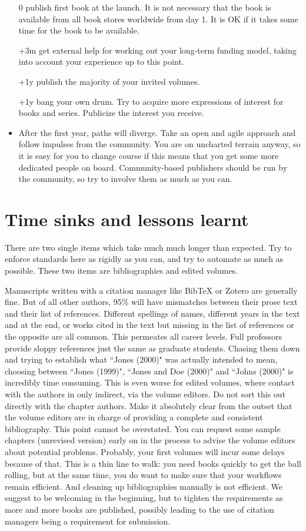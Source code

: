 \documentclass[nonflat,modfonts,output=book] {langsci/langscibook}
\begin{document}
\begin{itemize}
 \item[0] publish first book at the launch. It is not necessary that the book is available from all book stores worldwide from day 1. It is OK if it takes some time for the book to be available. 
 \item[+3m] get external help for working out your long-term funding model, taking into account your experience up to this point. 
 \item[+1y] publish the majority of your invited volumes. 
 \item[+1y] bang your own drum. Try to acquire more expressions of interest for books and series. Publicize the interest you receive. 
 \item After the first year, paths will diverge. Take an open and agile approach and follow impulses from the community. You are on uncharted terrain anyway, so it is easy for you to change course if this means that you get some more dedicated people on board. Community-based publishers should be run by the community, so try to involve them as much as you can.
\end{itemize}


\chapter{Time sinks and lessons learnt}
There are two single items which take much much longer than expected. Try to enforce standards here as rigidly as you can, and try to automate as much as possible. These two items are bibliographies and edited volumes. 

Manuscripts written with a citation manager like BibTeX or Zotero are generally fine. But of all other authors, 95\% will have mismatches between their prose text and their list of references. Different spellings of names, different years in the text and at the end, or works cited in the text but missing in the list of references or the opposite are all common. This permeates all career levels. Full professors provide sloppy references just the same as graduate students. Chasing them down and trying to establish what ``Jones (2000)" was actually intended to mean, choosing between ``Jones (1999)", ``Jones and Doe (2000)" and ``Johns (2000)" is incredibly time consuming. This is even worse for edited volumes, where contact with the authors in only indirect, via the volume editors. Do not sort this out directly with the chapter authors. Make it absolutely clear from the outset that the volume editors are in charge of providing a complete and consistent bibliography. This point cannot be overstated. You can request some sample chapters (unrevised version) early on in the process to advise the volume editors about potential problems. Probably, your first volumes will incur some delays because of that. This is a thin line to walk: you need books quickly to get the ball rolling, but at the same time, you do want to make sure that your workflows remain efficient. And cleaning up bibliographies manually is not efficient. We suggest to be welcoming in the beginning, but to tighten the requirements as more and more books are published, possibly leading to the use of citation managers being a requirement for submission. 
\end{document}
